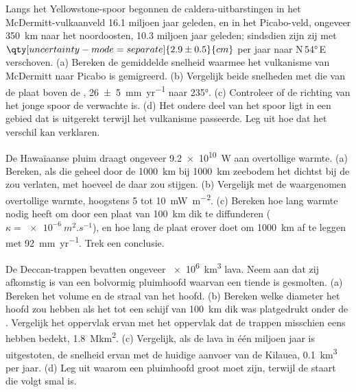 \begin{exercise}[$\star\star$]\label{exo:b1:hotspots:8}
Langs het Yellowstone-spoor begonnen de caldera-uitbarstingen in het McDermitt-vulkaanveld 16.1 miljoen jaar geleden, en in het Picabo-veld, ongeveer \qty{350}{km} naar het noordoosten, 10.3 miljoen jaar geleden; sindsdien zijn zij met $\qty[uncertainty-mode=separate]{2.9 \pm 0.5}{cm}$ per jaar naar N\,\ang{54}\,E verschoven. (a) Bereken de gemiddelde snelheid waarmee het vulkanisme van McDermitt naar Picabo is gemigreerd. (b) Vergelijk beide snelheden met die van de plaat boven de , \qty[uncertainty-mode=separate]{26 \pm 5}{mm.yr^{-1}} naar \ang{235}. (c) Controleer of de richting van het jonge spoor de verwachte is. (d) Het oudere deel van het spoor ligt in een gebied dat is uitgerekt terwijl het vulkanisme passeerde. Leg uit hoe dat het verschil kan verklaren.
\end{exercise}

\begin{exercise}[$\star\star$]\label{exo:b1:hotspots:9}
De Hawaïaanse pluim draagt ongeveer \qty{9.2e10}{W} aan overtollige warmte. (a) Bereken, als die geheel door de \qty{1000}{km} bij \qty{1000}{km} zeebodem het dichtst bij de  zou verlaten, met hoeveel de  daar zou stijgen. (b) Vergelijk met de waargenomen overtollige warmte, hoogstens 5 tot \qty{10}{mW.m^{-2}}. (c) Bereken hoe lang warmte nodig heeft om door een plaat van \qty{100}{km} dik te diffunderen ($\kappa = \qty{e-6}{m^2.s^{-1}}$), en hoe lang de plaat erover doet om \qty{1000}{km} af te leggen met \qty{92}{mm.yr^{-1}}. Trek een conclusie.
\end{exercise}

\begin{exercise}[$\star\star\star$]\label{exo:b1:hotspots:10}
De Deccan-trappen bevatten ongeveer \qty{e6}{km^3} lava. Neem aan dat zij afkomstig is van een bolvormig pluimhoofd waarvan een tiende is gesmolten. (a) Bereken het volume en de straal van het hoofd. (b) Bereken welke diameter het hoofd zou hebben als het tot een schijf van \qty{100}{km} dik was platgedrukt onder de . Vergelijk het oppervlak ervan met het oppervlak dat de trappen misschien eens hebben bedekt, \qty{1.8}{\mega km^2}. (c) Vergelijk, als de lava in één miljoen jaar is uitgestoten, de snelheid ervan met de huidige aanvoer van de Kilauea, \qty{0.1}{km^3} per jaar. (d) Leg uit waarom een pluimhoofd groot moet zijn, terwijl de staart die volgt smal is.
\end{exercise}

